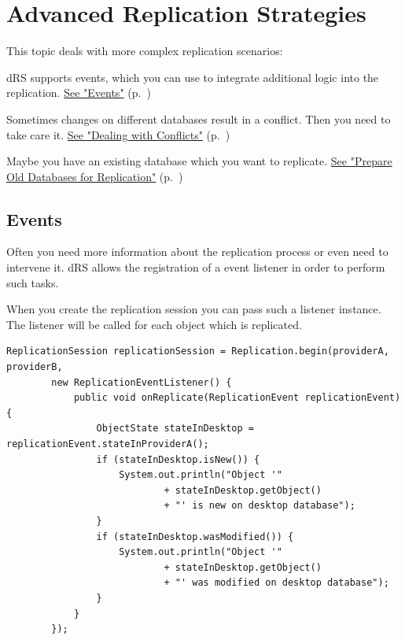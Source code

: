 
\chapter{Advanced Replication Strategies}
\label{drs:db4o-replication-system-drs-advanced-replication-strategies}

This topic deals with more complex replication scenarios:

dRS supports events, which you can use to integrate additional logic into the replication. \hyperref[drs:db4o-replication-system-drs-advanced-replication-strategies-events]{See "Events"} (p.~\pageref{drs:db4o-replication-system-drs-advanced-replication-strategies-events})

Sometimes changes on different databases result in a conflict. Then you need to take care it. \hyperref[drs:db4o-replication-system-drs-advanced-replication-strategies-dealing-with-conflicts]{See "Dealing with Conflicts"} (p.~\pageref{drs:db4o-replication-system-drs-advanced-replication-strategies-dealing-with-conflicts})

Maybe you have an existing database which you want to replicate. \hyperref[drs:db4o-replication-system-drs-advanced-replication-strategies-prepare-old-databases-for-replication]{See "Prepare Old Databases for Replication"} (p.~\pageref{drs:db4o-replication-system-drs-advanced-replication-strategies-prepare-old-databases-for-replication})

\section{Events}
\label{drs:db4o-replication-system-drs-advanced-replication-strategies-events}

Often you need more information about the replication process or even need to intervene it. dRS allows the registration of a event listener in order to perform such tasks.

When you create the replication session you can pass such a listener instance. The listener will be called for each object which is replicated.

\begin{lstlisting}
ReplicationSession replicationSession = Replication.begin(providerA, providerB,
        new ReplicationEventListener() {
            public void onReplicate(ReplicationEvent replicationEvent) {
                ObjectState stateInDesktop = replicationEvent.stateInProviderA();
                if (stateInDesktop.isNew()) {
                    System.out.println("Object '"
                            + stateInDesktop.getObject()
                            + "' is new on desktop database");
                }
                if (stateInDesktop.wasModified()) {
                    System.out.println("Object '"
                            + stateInDesktop.getObject()
                            + "' was modified on desktop database");
                }
            }
        });
\end{lstlisting}

